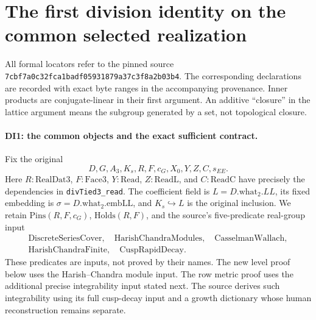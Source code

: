 \section{The first division identity on the common selected realization}
\label{sec:division-identity}


All formal locators refer to the pinned source
\texttt{7cbf7a0c32fca1badf05931879a37c3f8a2b03b4}.
The corresponding declarations are recorded with exact byte ranges in
the accompanying provenance. Inner products are conjugate-linear in
their first argument. An additive ``closure'' in the lattice argument
means the subgroup generated by a set, not topological closure.

\paragraph{DI1: the common objects and the exact sufficient contract.}
\label{claim:DI1}
Fix the original
\[
 D,G,A_3,K_s,R,F,c_G,X_0,Y,Z,C,s_{EE}.
 \tag{DI.1}
\]
Here \(R:\mathrm{RealDat3}\), \(F:\mathrm{Face3}\),
\(Y:\mathrm{Read}\), \(Z:\mathrm{ReadL}\), and
\(C:\mathrm{ReadC}\) have precisely the dependencies in
\texttt{divTied3\_read}. The coefficient field is
\(L=D.\mathrm{what}_2.LL\), its fixed embedding is
\(\sigma=D.\mathrm{what}_2.\mathrm{embLL}\), and
\(K_s\hookrightarrow L\) is the original inclusion. We retain
\(\mathrm{Pins}(R,F,c_G)\), \(\mathrm{Holds}(R,F)\), and the source's
five-predicate real-group input
\[
 \begin{gathered}
 \mathrm{DiscreteSeriesCover},\quad
 \mathrm{HarishChandraModules},\quad
 \mathrm{CasselmanWallach},\\
 \mathrm{HarishChandraFinite},\quad
 \mathrm{CuspRapidDecay}.
 \end{gathered}
 \tag{DI.2}
\]
These predicates are inputs, not proved by their names. The new level
proof below uses the Harish--Chandra module input. The row metric proof
uses the additional precise integrability input stated next. The
source derives such integrability using its full cusp-decay input
and a growth dictionary whose human reconstruction remains separate.

